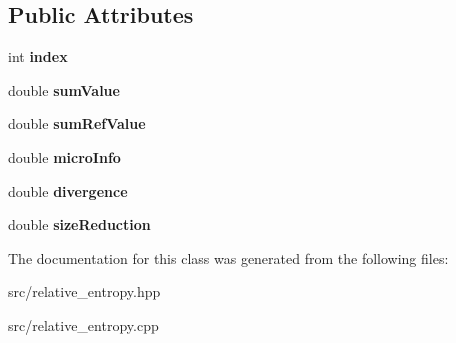 \subsection*{Public Attributes}
\begin{DoxyCompactItemize}
\item 
\hypertarget{classRelativeObjectiveValue_aea16ecc724a19b7aa101645c1b79c214}{int {\bfseries index}}\label{classRelativeObjectiveValue_aea16ecc724a19b7aa101645c1b79c214}

\item 
\hypertarget{classRelativeObjectiveValue_a550566fd0f5c3ba5e23c1d2b3f8a222f}{double {\bfseries sum\-Value}}\label{classRelativeObjectiveValue_a550566fd0f5c3ba5e23c1d2b3f8a222f}

\item 
\hypertarget{classRelativeObjectiveValue_aae52cf2c1495424a38810d86fc0626a5}{double {\bfseries sum\-Ref\-Value}}\label{classRelativeObjectiveValue_aae52cf2c1495424a38810d86fc0626a5}

\item 
\hypertarget{classRelativeObjectiveValue_a70616b5d6c0d850db579b56be13c40c4}{double {\bfseries micro\-Info}}\label{classRelativeObjectiveValue_a70616b5d6c0d850db579b56be13c40c4}

\item 
\hypertarget{classRelativeObjectiveValue_a3b3689878505968dcb7869fe75a076e4}{double {\bfseries divergence}}\label{classRelativeObjectiveValue_a3b3689878505968dcb7869fe75a076e4}

\item 
\hypertarget{classRelativeObjectiveValue_a74505a2829b53ac5c401dddfeb8cba38}{double {\bfseries size\-Reduction}}\label{classRelativeObjectiveValue_a74505a2829b53ac5c401dddfeb8cba38}

\end{DoxyCompactItemize}


The documentation for this class was generated from the following files\-:\begin{DoxyCompactItemize}
\item 
src/relative\-\_\-entropy.\-hpp\item 
src/relative\-\_\-entropy.\-cpp\end{DoxyCompactItemize}
